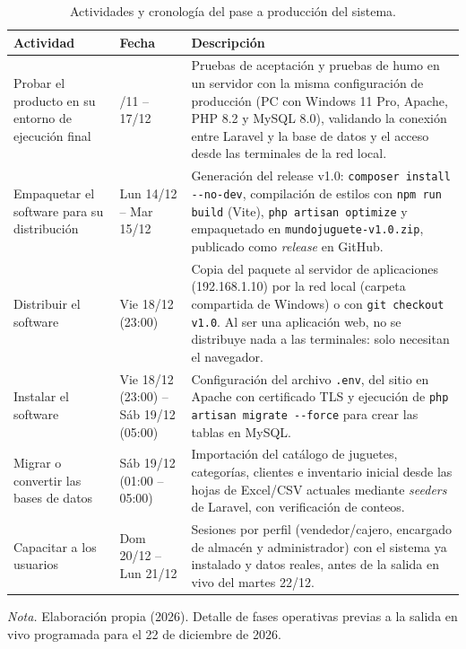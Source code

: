 \begin{table}[H]
  \centering
  \caption{Actividades y cronología del pase a producción del sistema.}
  \label{tab:despliegue_actividades}
  \begin{tabularx}{\linewidth}{|>{\raggedright\arraybackslash}p{4.2cm}|>{\raggedright\arraybackslash}p{2.5cm}|>{\raggedright\arraybackslash}X|}
    \hline
    \textbf{Actividad} & \textbf{Fecha} & \textbf{Descripción} \\ \hline
    Probar el producto en su entorno de ejecución final &
    23/11 -- 17/12 &
    Pruebas de aceptación y pruebas de humo en un servidor con la misma configuración de producción (PC con Windows 11 Pro, Apache, PHP 8.2 y MySQL 8.0), validando la conexión entre Laravel y la base de datos y el acceso desde las terminales de la red local. \\ \hline
    Empaquetar el software para su distribución &
    Lun 14/12 -- Mar 15/12 &
    Generación del release v1.0: \texttt{composer install -{}-no-dev}, compilación de estilos con \texttt{npm run build} (Vite), \texttt{php artisan optimize} y empaquetado en \texttt{mundojuguete-v1.0.zip}, publicado como \emph{release} en GitHub. \\ \hline
    Distribuir el software &
    Vie 18/12 (23:00) &
    Copia del paquete al servidor de aplicaciones (192.168.1.10) por la red local (carpeta compartida de Windows) o con \texttt{git checkout v1.0}. Al ser una aplicación web, no se distribuye nada a las terminales: solo necesitan el navegador. \\ \hline
    Instalar el software &
    Vie 18/12 (23:00) -- Sáb 19/12 (05:00) &
    Configuración del archivo \texttt{.env}, del sitio en Apache con certificado TLS y ejecución de \texttt{php artisan migrate -{}-force} para crear las tablas en MySQL. \\ \hline
    Migrar o convertir las bases de datos &
    Sáb 19/12 (01:00 -- 05:00) &
    Importación del catálogo de juguetes, categorías, clientes e inventario inicial desde las hojas de Excel/CSV actuales mediante \emph{seeders} de Laravel, con verificación de conteos. \\ \hline
    Capacitar a los usuarios &
    Dom 20/12 -- Lun 21/12 &
    Sesiones por perfil (vendedor/cajero, encargado de almacén y administrador) con el sistema ya instalado y datos reales, antes de la salida en vivo del martes 22/12. \\ \hline
  \end{tabularx}
  \par\vspace{0.2cm}
  {\raggedright \small \emph{Nota.} Elaboración propia (2026). Detalle de fases operativas previas a la salida en vivo programada para el 22 de diciembre de 2026.\par}
\end{table}

